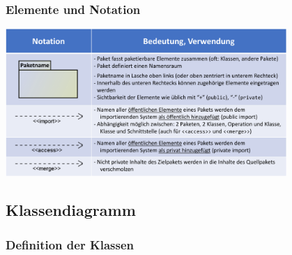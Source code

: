 \documentclass[11pt, a4paper]{article}
\begin{document}
\subsubsection{Elemente und Notation}

\centering \includegraphics[width=0.8\textwidth]{Paket-03.png}


\newpage

\raggedright \subsection{Klassendiagramm}

\vspace{1em}

\raggedright \subsubsection{Definition der Klassen}

\vspace{1em}
\end{document}
